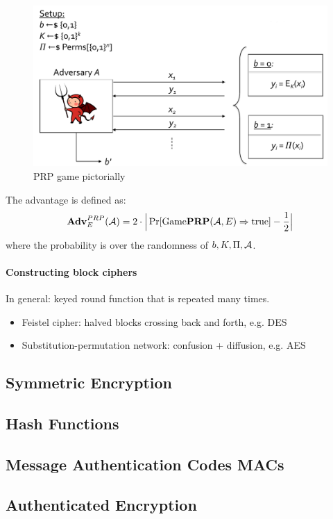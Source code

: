 \begin{figure}[h]
    \centering
	\includegraphics[scale=0.4]{images/prp.png}
    \caption{PRP game pictorially}
    \label{fig:prp}
\end{figure}

The advantage is defined as:
$$
\mathbf{Adv}^{PRP}_E (\mathcal{A})
= 2 \cdot \Big| \Pr[ \text{Game}\textbf{PRP}(\mathcal{A}, E) \Rightarrow \text{true} ] - \frac{1}{2} \Big|
$$
where the probability is over the randomness of $b, K, \Pi, \mathcal{A}$.

\paragraph{Constructing block ciphers}
In general: keyed round function that is repeated many times.

\begin{itemize}
\item Feistel cipher: halved blocks crossing back and forth, e.g. DES
\item Substitution-permutation network: confusion + diffusion, e.g. AES
\end{itemize}


\subsection{Symmetric Encryption}


\subsection{Hash Functions}


\subsection{Message Authentication Codes MACs}


\subsection{Authenticated Encryption}

